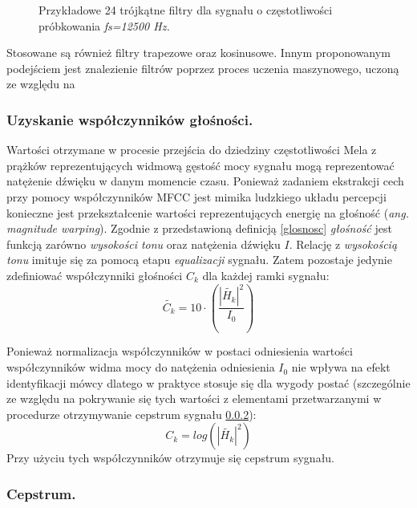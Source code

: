 \begin{figure}
  \centering
    
    \label{melfb}
    \caption{Przykładowe 24 trójkątne filtry dla sygnału o częstotliwości próbkowania \textit{fs=12500 Hz.}}
\end{figure}

Stosowane są również filtry trapezowe oraz kosinusowe. Innym proponowanym podejściem jest znalezienie filtrów poprzez proces uczenia maszynowego, uczoną ze względu na %

\subsubsection{Uzyskanie współczynników głośności.}
Wartości otrzymane w procesie przejścia do dziedziny częstotliwości Mela z prążków reprezentujących widmową gęstość mocy sygnału mogą reprezentować natężenie dźwięku w danym momencie czasu. Ponieważ zadaniem ekstrakcji cech przy pomocy współczynników MFCC jest mimika ludzkiego układu percepcji konieczne jest przekształcenie wartości reprezentujących energię na głośność (\textit{ang. magnitude warping}). Zgodnie z przedstawioną definicją \ref{glosnosc} \textit{głośność} jest funkcją zarówno \textit{wysokości tonu} oraz natężenia dźwięku $ I $. Relację z \textit{wysokością tonu} imituje się za pomocą etapu \textit{equalizacji} sygnału. Zatem pozostaje jedynie zdefiniować współczynniki głośności $ C_k $ \cite{fosr} dla każdej ramki sygnału:
\begin{equation}
  \tilde{C_k} = 10 \cdot \left( \frac{|\tilde{H_k}|^2}{I_0} \right) 
\end{equation}

Ponieważ normalizacja współczynników w postaci odniesienia wartości współczynników widma mocy do natężenia odniesienia $I_0$ nie wpływa na efekt identyfikacji mówcy dlatego w praktyce stosuje się dla wygody postać (szczególnie ze względu na pokrywanie się tych wartości z elementami przetwarzanymi w procedurze otrzymywanie cepstrum sygnału \ref{cepstrum}):
\begin{equation}
  C_k = log \left(|\tilde{H_k}|^2 \right)
\end{equation}
Przy użyciu tych współczynników otrzymuje się cepstrum sygnału.

\subsubsection{Cepstrum.}
\label{cepstrum}

